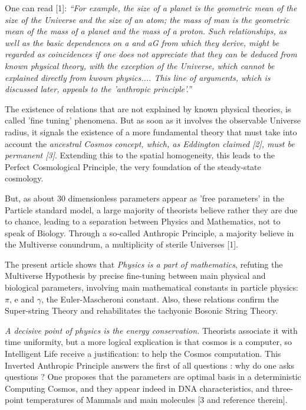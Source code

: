 \documentclass[twoside,draft]{article}
\begin{document}
\begin{sloppypar}
{One can read [1]: \textit{“For example, the size of a planet is the geometric mean of the size of the Universe and the size of an atom; the mass of man is the geometric mean of the mass of a planet and the mass of a proton. Such relationships, as well as the basic dependences on a and aG from which they derive, might be regarded as coincidences if one does not appreciate that they can be deduced from known physical theory, with the exception of the Universe, which cannot be explained directly from kwown physics.... This line of arguments, which is discussed later, appeals to the 'anthropic principle'.”}

The existence of relations that are not explained by known physical theories, is called 'fine tuning' phenomena. But as soon as it involves the observable Universe radius, it signals the existence of a more fundamental theory that must take into account the \textit{ancestral Cosmos concept, which, as Eddington claimed [2], must be permanent [3]}. Extending this to the spatial homogeneity, this leads to the Perfect Cosmological Principle, the very foundation of the steady-state cosmology.

But, as about 30 dimensionless parameters appear as 'free parameters' in the Particle standard model, a large majority of theorists believe rather they are due to chance, leading to a separation between Physics and Mathematics, not to speak of Biology. Through a so-called Anthropic Principle, a majority believe in the Multiverse conundrum, a multiplicity of sterile Universes [1].

The present article shows that \textit{Physics is a part of mathematics}, refuting the Multiverse Hypothesis by precise fine-tuning between main physical and biological parameters, involving main mathematical constants in particle physics: $\pi$,  e and $\gamma$, the Euler-Mascheroni constant. Also, these relations confirm the Super-string Theory and rehabilitates the tachyonic Bosonic String Theory.

\textit{A decisive point of physics is the energy conservation.} Theorists associate it with time uniformity, but a more logical explication is that cosmos is a computer, so Intelligent Life receive a justification: to help the Cosmos computation. This Inverted Anthropic Principle answers the first of all questions : why do one asks questions ? One proposes that the parameters are optimal basis in a deterministic Computing Cosmos, and they appear indeed in DNA characteristics, and three-point temperatures of Mammals and main molecules [3 and reference therein].

}
\end{sloppypar}
\end{document}

